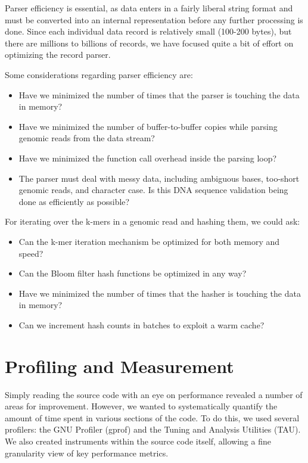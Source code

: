 \documentclass{article}
\begin{document}
Parser efficiency is essential, as data enters in a fairly liberal
string format and must be converted into an internal representation before
any further processing is done.  Since each individual data record is
relatively small (100-200 bytes), but there are millions to billions of
records, we have focused quite a bit of effort on optimizing the
record parser.

Some considerations regarding parser efficiency are:
\begin{itemize}
\item Have we minimized the number of times that the parser is touching the 
data in memory?
\item Have we minimized the number of buffer-to-buffer copies while parsing 
genomic reads from the data stream?
\item Have we minimized the function call overhead inside the parsing loop?
\item The parser must deal with messy data, including ambiguous bases,
too-short genomic reads, and character case.  Is this DNA sequence validation being done as efficiently as possible?
\end{itemize}

For iterating over the k-mers in a genomic read and hashing them, we could ask:
\begin{itemize}
\item Can the k-mer iteration mechanism be optimized for both memory and speed?
\item Can the Bloom filter hash functions be optimized in any way?
\item Have we minimized the number of times that the hasher is touching the 
data in memory?
\item Can we increment hash counts in batches to exploit a warm cache?
\end{itemize}

\section{Profiling and Measurement}

Simply reading the source code with an eye on performance revealed a number of
areas for improvement. However, we wanted to systematically quantify the amount
of time spent in various sections of the code. To do this, we used several
profilers: the GNU Profiler (gprof) and the Tuning and Analysis Utilities
(TAU). We also created instruments within the source code itself, allowing a
fine granularity view of key performance metrics.
\end{document}
